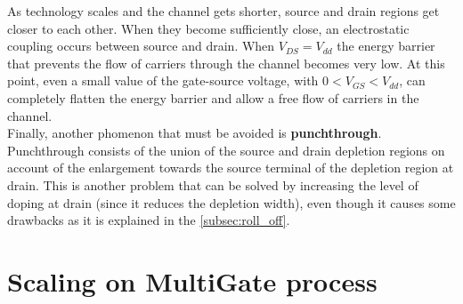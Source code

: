 \documentclass[a4paper, 12pt, twoside, openright]{report}
\begin{document}
As technology scales and the channel gets shorter, source and drain regions get closer to each other. When they become sufficiently close, an electrostatic coupling occurs between source and drain. When $V_{DS}=V_{dd}$ the energy barrier that prevents the flow of carriers through the channel becomes very low. At this point, even a small value of the gate-source voltage, with $0 < V_{GS} < V_{dd}$, can completely flatten the energy barrier and allow a free flow of carriers in the channel. \\
Finally, another phomenon that must be avoided is \textbf{punchthrough}. Punchthrough consists of the union of the source and drain depletion regions on account of the enlargement towards the source terminal of the depletion region at drain. This is another problem that can be solved by increasing the level of doping at drain (since it reduces the depletion width), even though it causes some drawbacks as it is explained in the \ref{subsec:roll_off}.\\
 





\newpage

\chapter{Scaling on MultiGate process}
\end{document}
